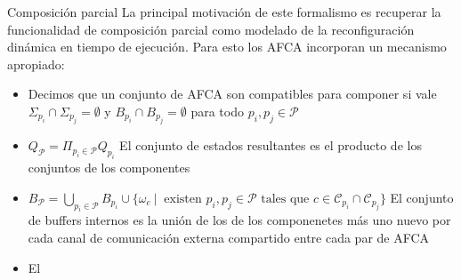 \documentclass[10pt,xcolor={table,dvipsnames},t]{beamer}
\begin{document}
\begin{frame}{Composición parcial}
La principal motivación de este formalismo es recuperar la funcionalidad de composición parcial como modelado de la reconfiguración dinámica en tiempo de ejecución. Para esto los AFCA incorporan un mecanismo apropiado:
\begin{itemize}
    \item Decimos que un conjunto de AFCA son compatibles para componer si vale $\Sigma_{p_i} \cap \Sigma_{p_j}= \emptyset$ y $B_{p_i} \cap B_{p_j} = \emptyset$ para todo $p_i, p_j \in \mathcal{P}$
    \item $Q_\mathcal{P}= \Pi_{p_i \in \mathcal{P}} Q_{p_i}$ El conjunto de estados resultantes es el producto de los conjuntos de los componentes
    \item $B_\mathcal{P} = \bigcup_{p_i \in \mathcal{P}} B_{p_i} \cup \{ \omega_c \ | \ \mbox{ existen } p_i, p_j \in \mathcal{P} \mbox{ tales que } c \in \mathcal{C}_{p_i} \cap \mathcal{C}_{p_j} \}$ El conjunto de buffers internos es la unión de los de los componenetes más uno nuevo por cada canal de comunicación externa compartido entre cada par de AFCA
    \item El 
\end{itemize}
    
\end{frame}
\end{document}
